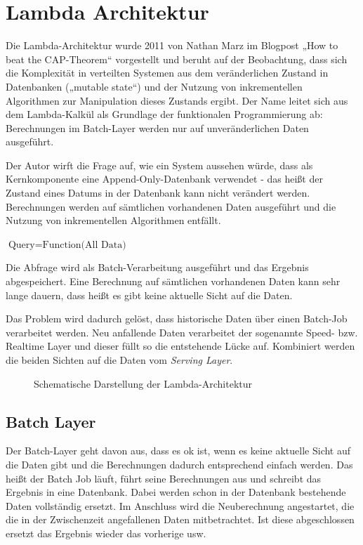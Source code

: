 \documentclass[a4paper,11pt]{scrartcl}
\begin{document}
  \section{Lambda Architektur}
  Die Lambda-Architektur wurde 2011 von Nathan Marz im Blogpost „How to beat
  the CAP-Theorem“\cite{marz2011} vorgestellt und beruht auf der Beobachtung,
  dass sich die Komplexität in verteilten Systemen aus dem veränderlichen
  Zustand in Datenbanken („mutable state“) und der Nutzung von inkrementellen
  Algorithmen zur Manipulation dieses Zustands ergibt.  Der Name leitet sich
  aus dem Lambda-Kalkül als Grundlage der funktionalen Programmierung ab:
  Berechnungen im Batch-Layer werden nur auf unveränderlichen Daten ausgeführt.

  Der Autor wirft die Frage auf, wie ein System aussehen würde, dass als
  Kernkomponente eine Append-Only-Datenbank verwendet - das heißt der Zustand
  eines Datums in der Datenbank kann nicht verändert werden. Berechnungen werden
  auf sämtlichen vorhandenen Daten ausgeführt und die Nutzung von inkrementellen
  Algorithmen entfällt.

  $\text{Query} = \text{Function(All Data)}$

  Die Abfrage wird als Batch-Verarbeitung ausgeführt und das Ergebnis
  abgespeichert. Eine Berechnung auf sämtlichen vorhandenen Daten kann sehr lange
  dauern, dass heißt es gibt keine aktuelle Sicht auf die Daten.

  Das Problem wird dadurch gelöst, dass historische Daten über einen Batch-Job
  verarbeitet werden. Neu anfallende Daten verarbeitet der sogenannte Speed- bzw.
  Realtime Layer und dieser füllt so die entstehende Lücke auf. Kombiniert werden
  die beiden Sichten auf die Daten vom \textit{Serving Layer}.

  \begin{figure}[h]
    \center
    \scalebox{.7}{}
    \caption{Schematische Darstellung der Lambda-Architektur}
    \label{fig:lambdaarch}
  \end{figure}

  \subsection{Batch Layer}
  Der Batch-Layer geht davon aus, dass es ok ist, wenn es keine aktuelle Sicht
  auf die Daten gibt und die Berechnungen dadurch entsprechend einfach werden.
  Das heißt der Batch Job läuft, führt seine Berechnungen aus und schreibt das
  Ergebnis in eine Datenbank. Dabei werden schon in der Datenbank bestehende
  Daten vollständig ersetzt. Im Anschluss wird die Neuberechnung angestartet, die
  die in der Zwischenzeit angefallenen Daten mitbetrachtet. Ist diese
  abgeschlossen ersetzt das Ergebnis wieder das vorherige usw.
\end{document}
